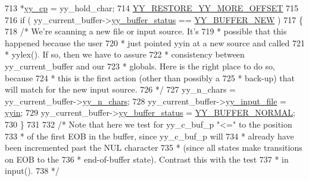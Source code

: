 \begin{DoxyCode}
713                 *\mbox{\hyperlink{expr-lex_8cpp_aebf8322d98e81db5af081bb22a5f06fe}{yy\_cp}} = yy\_hold\_char;
714                 \mbox{\hyperlink{expr-lex_8cpp_a56858d18c7eda4f53664496ef566f651}{YY\_RESTORE\_YY\_MORE\_OFFSET}}
715 
716                 \textcolor{keywordflow}{if} ( yy\_current\_buffer->\mbox{\hyperlink{structyy__buffer__state_a70fd925d37a2f0454fbd0def675d106c}{yy\_buffer\_status}} == 
      \mbox{\hyperlink{expr-lex_8cpp_a53579db42834b88199458993912c646d}{YY\_BUFFER\_NEW}} )
717                         \{
718                         \textcolor{comment}{/* We're scanning a new file or input source.  It's}
719 \textcolor{comment}{                         * possible that this happened because the user}
720 \textcolor{comment}{                         * just pointed yyin at a new source and called}
721 \textcolor{comment}{                         * yylex().  If so, then we have to assure}
722 \textcolor{comment}{                         * consistency between yy\_current\_buffer and our}
723 \textcolor{comment}{                         * globals.  Here is the right place to do so, because}
724 \textcolor{comment}{                         * this is the first action (other than possibly a}
725 \textcolor{comment}{                         * back-up) that will match for the new input source.}
726 \textcolor{comment}{                         */}
727                         yy\_n\_chars = yy\_current\_buffer->\mbox{\hyperlink{structyy__buffer__state_a06406208824817acfec2183b79080945}{yy\_n\_chars}};
728                         yy\_current\_buffer->\mbox{\hyperlink{structyy__buffer__state_a4843d1422e3276b636d475a3095bd948}{yy\_input\_file}} = \mbox{\hyperlink{expr-lex_8cpp_a87a127afa8f6c307fbfba10390675406}{yyin}};
729                         yy\_current\_buffer->\mbox{\hyperlink{structyy__buffer__state_a70fd925d37a2f0454fbd0def675d106c}{yy\_buffer\_status}} = 
      \mbox{\hyperlink{expr-lex_8cpp_a609d19f40900ecc2a5f812d9388c21fb}{YY\_BUFFER\_NORMAL}};
730                         \}
731 
732                 \textcolor{comment}{/* Note that here we test for yy\_c\_buf\_p "<=" to the position}
733 \textcolor{comment}{                 * of the first EOB in the buffer, since yy\_c\_buf\_p will}
734 \textcolor{comment}{                 * already have been incremented past the NUL character}
735 \textcolor{comment}{                 * (since all states make transitions on EOB to the}
736 \textcolor{comment}{                 * end-of-buffer state).  Contrast this with the test}
737 \textcolor{comment}{                 * in input().}
738 \textcolor{comment}{                 */}

\end{DoxyCode}
